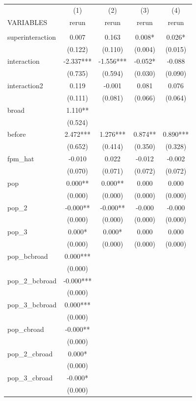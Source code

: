 \documentclass[]{article}
\begin{document}
\begin{tabular}{lcccc} \hline
 & (1) & (2) & (3) & (4) \\
VARIABLES & rerun & rerun & rerun & rerun \\ \hline
 &  &  &  &  \\
superinteraction & 0.007 & 0.163 & 0.008* & 0.026* \\
 & (0.122) & (0.110) & (0.004) & (0.015) \\
interaction & -2.337*** & -1.556*** & -0.052* & -0.088 \\
 & (0.735) & (0.594) & (0.030) & (0.090) \\
interaction2 & 0.119 & -0.001 & 0.081 & 0.076 \\
 & (0.111) & (0.081) & (0.066) & (0.064) \\
broad & 1.110** &  &  &  \\
 & (0.524) &  &  &  \\
before & 2.472*** & 1.276*** & 0.874** & 0.890*** \\
 & (0.652) & (0.414) & (0.350) & (0.328) \\
fpm\_hat & -0.010 & 0.022 & -0.012 & -0.002 \\
 & (0.070) & (0.071) & (0.072) & (0.072) \\
pop & 0.000** & 0.000** & 0.000 & 0.000 \\
 & (0.000) & (0.000) & (0.000) & (0.000) \\
pop\_2 & -0.000** & -0.000** & -0.000 & -0.000 \\
 & (0.000) & (0.000) & (0.000) & (0.000) \\
pop\_3 & 0.000* & 0.000* & 0.000 & 0.000 \\
 & (0.000) & (0.000) & (0.000) & (0.000) \\
pop\_bcbroad & 0.000*** &  &  &  \\
 & (0.000) &  &  &  \\
pop\_2\_bcbroad & -0.000*** &  &  &  \\
 & (0.000) &  &  &  \\
pop\_3\_bcbroad & 0.000*** &  &  &  \\
 & (0.000) &  &  &  \\
pop\_cbroad & -0.000** &  &  &  \\
 & (0.000) &  &  &  \\
pop\_2\_cbroad & 0.000* &  &  &  \\
 & (0.000) &  &  &  \\
pop\_3\_cbroad & -0.000* &  &  &  \\
 & (0.000) &  &  &  \\

\end{tabular}
\end{document}
